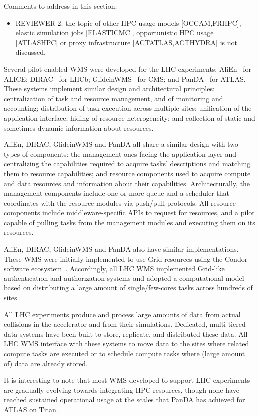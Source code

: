 \ifreview
Comments to address in this section:
\begin{itemize}
	\color{red} 
	\item REVIEWER 2: the topic of other HPC usage models [OCCAM,FRHPC],
	elastic simulation jobs [ELASTICMC], opportunistic HPC usage [ATLASHPC]
	or proxy infrastructure [ACTATLAS,ACTHYDRA] is not discussed.
\end{itemize}
\fi

Several pilot-enabled WMS were developed for the LHC experiments:
AliEn~\cite{Bagnasco2010} for ALICE\@; DIRAC~\cite{Paterson2010} for LHCb;
GlideinWMS~\cite{sfiligoi2008glideinwms} for CMS\@; and
PanDA~\cite{maeno2014evolution} for ATLAS\@. These systems implement similar
design and architectural principles: centralization of task and resource
management, and of monitoring and accounting; distribution of task execution
across multiple sites; unification of the application interface; hiding of
resource heterogeneity; and collection of static and sometimes dynamic
information about resources.

AliEn, DIRAC, GlideinWMS and PanDA all share a similar design with two types
of components: the management ones facing the application layer and
centralizing the capabilities required to acquire tasks' descriptions and
matching them to resource capabilities; and resource components used to
acquire compute and data resources and information about their capabilities.
Architecturally, the management components include one or more queue and a
scheduler that coordinates with the resource modules via push/pull protocols.
All resource components include middleware-specific APIs to request for
resources, and a pilot capable of pulling tasks from the management modules
and executing them on its resources.


AliEn, DIRAC, GlideinWMS and PanDA also have similar implementations. These
WMS were initially implemented to use Grid resources using the Condor
software ecosystem~\cite{thain2005distributed}. Accordingly, all LHC WMS
implemented Grid-like authentication and authorization systems and adopted a
computational model based on distributing a large amount of single/few-cores
tasks across hundreds of sites.

All LHC experiments produce and process large amounts  of data from actual
collisions in the accelerator and from their simulations. Dedicated,
multi-tiered data systems have been built to store, replicate, and
distributed these data. All LHC WMS interface with these systems to move data
to the sites where related compute tasks are executed or to schedule compute
tasks where (large amount of) data are already stored.

It is interesting to note that most WMS developed to support LHC experiments
are gradually evolving towards integrating HPC resources, though none have
reached sustained operational usage at the scales that PanDA has achieved for
ATLAS on Titan.